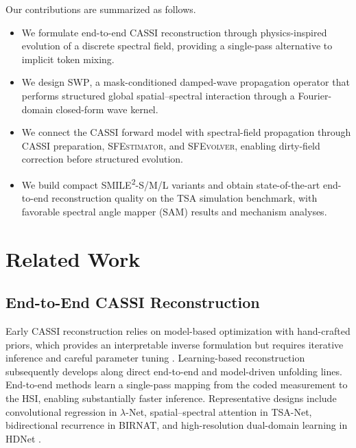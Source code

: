 \documentclass[letterpaper]{article} %
\newcommand{\smiletwo}{SMILE\textsuperscript{2}}
\newcommand{\sfestimator}{\textsc{SFEstimator}}
\newcommand{\sfevolver}{\textsc{SFEvolver}}
\newcommand{\swp}{\textsc{SWP}}
\begin{document}
Our contributions are summarized as follows.
\begin{itemize}
  \item We formulate end-to-end CASSI reconstruction through physics-inspired evolution of a discrete spectral field, providing a single-pass alternative to implicit token mixing.
  \item We design \swp{}, a mask-conditioned damped-wave propagation operator that performs structured global spatial--spectral interaction through a Fourier-domain closed-form wave kernel.
  \item We connect the CASSI forward model with spectral-field propagation through CASSI preparation, \sfestimator{}, and \sfevolver{}, enabling dirty-field correction before structured evolution.
  \item We build compact \smiletwo-S/M/L variants and obtain state-of-the-art end-to-end reconstruction quality on the TSA simulation benchmark, with favorable spectral angle mapper (SAM) results and mechanism analyses.
\end{itemize}

\section{Related Work}

\subsection{End-to-End CASSI Reconstruction}

Early CASSI reconstruction relies on model-based optimization with hand-crafted priors, which provides an interpretable inverse formulation but requires iterative inference and careful parameter tuning \cite{bioucasdias2007twist,yuan2016gaptv,liu2018rank}.
Learning-based reconstruction subsequently develops along direct end-to-end and model-driven unfolding lines.
End-to-end methods learn a single-pass mapping from the coded measurement to the HSI, enabling substantially faster inference.
Representative designs include convolutional regression in \(\lambda\)-Net, spatial--spectral attention in TSA-Net, bidirectional recurrence in BIRNAT, and high-resolution dual-domain learning in HDNet \cite{miao2019lambdanet,meng2020tsanet,cheng2022recurrent,hu2022hdnet}.
\end{document}
